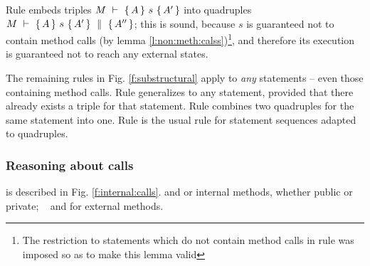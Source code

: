 {Rule {} embeds  triples  ${\hproves{M}  {A} {\ s\ }{A'} }$  into quadruples ${M\ \vdash\ \{\,A\, \} \ s\  \{\,A'\, \}\, \,\parallel\,\, \{\, A'' \, \} }$; this is sound, because $s$ is guaranteed not to contain method calls (by lemma \ref{l:non:meth:calss})\footnote{The restriction to statements which do not contain method calls in rule {} was imposed so as to make this lemma valid}, and therefore its execution is guaranteed not to reach any external states.

 
The remaining rules in Fig. \ref{f:substructural} apply to \emph{any} statements -- even those containing method calls.
 Rule {} generalizes {} to any statement, provided that  there already exists a triple for that statement.
Rule {} combines two quadruples for the same statement into one.
Rule   {}is the usual rule  for statement sequences  adapted to quadruples.



\subsubsection{Reasoning about   calls}
is described in Fig. \ref{f:internal:calls}. {}  and {}  or internal methods, whether public or private;  \  {} 
and {} for  external methods.


}
